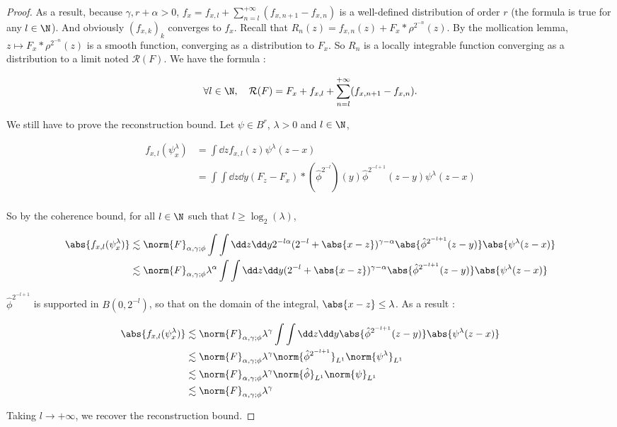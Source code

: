 \begin{proof}
As a result, because $\gamma, r+\alpha >0$, $f_x = f_{x,l} + \sum_{n=l}^{+\infty}(f_{x,n+1} - f_{x,n})$ is a well-defined distribution of order $r$ (the formula is true for any $l\in \N$).
And obviously $(f_{x,k})_k$ converges to $f_x$.
Recall that $R_n(z) = f_{x,n} (z) + F_x*\rho^{2^{-n}}(z)$. By the mollication lemma, $z \mapsto F_x*\rho^{2^{-n}}(z)$ is a smooth function, converging as a distribution to $F_x$.
So $R_n$ is a locally integrable function converging as a distribution to a limit noted $\mathcal{R}(F)$.
We have the formula :

\begin{equation*}
    \forall l\in \N,\quad  \mathcal{R}(F) = F_x + f_{x,l} + \sum_{n=l}^{+\infty}(f_{x,n+1} - f_{x,n}).
\end{equation*}

We still have to prove the reconstruction bound.
Let $\psi \in B^r$, $\lambda >0$ and $l\in \N$,

\begin{align*}
    f_{x,l}(\psi_x^\lambda) &= \int \dd z f_{x,l}(z) \psi^\lambda(z - x) \\
    &= \int \int \dd z  \dd y (F_z - F_x)*(\hat{\phi}^{2^{-l}})(y)  \hat{\phi}^{2^{-l+1}}(z-y) \psi^\lambda(z - x) \\
\end{align*}

So by the coherence bound, for all $l\in \N$ such that $l\geq \operatorname{log}_2 (\lambda)$,

\begin{align*}
    \abs{f_{x,l}(\psi_x^\lambda)} &\lesssim \norm{F}_{\alpha,\gamma;\phi} \int \int \dd z  \dd y 2^{-l\alpha}(2^{-l}+\abs{x - z})^{\gamma - \alpha}  \abs{\hat{\phi}^{2^{-l+1}}(z-y)} \abs{\psi^\lambda(z - x)} \\
    &\lesssim \norm{F}_{\alpha,\gamma;\phi} \lambda^{\alpha} \int \int \dd z  \dd y (2^{-l}+\abs{x - z})^{\gamma - \alpha}  \abs{\hat{\phi}^{2^{-l+1}}(z-y)} \abs{\psi^\lambda(z - x)} \\
\end{align*}

$\hat{\phi}^{2^{-l+1}}$ is supported in $B(0,2^{-l})$, so that on the domain of the integral, $\abs{x - z}\leq \lambda$. As a result :

\begin{align*}
    \abs{f_{x,l}(\psi_x^\lambda)} &\lesssim \norm{F}_{\alpha,\gamma;\phi} \lambda^{\gamma} \int \int \dd z  \dd y \abs{\hat{\phi}^{2^{-l+1}}(z-y)} \abs{\psi^\lambda(z - x)} \\
    &\lesssim \norm{F}_{\alpha,\gamma;\phi} \lambda^{\gamma} \norm{\hat{\phi}^{2^{-l+1}}}_{L^1} \norm{\psi^\lambda}_{L^1} \\
    &\lesssim \norm{F}_{\alpha,\gamma;\phi} \lambda^{\gamma} \norm{\hat{\phi}}_{L^1} \norm{\psi}_{L^1} \\
    &\lesssim \norm{F}_{\alpha,\gamma;\phi} \lambda^{\gamma} 
\end{align*}

Taking $l\rightarrow +\infty$, we recover the reconstruction bound.










\end{proof}
